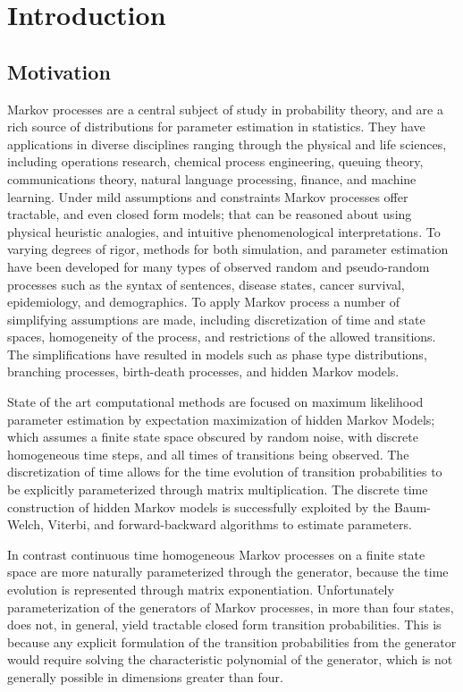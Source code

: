\chapter{Introduction}
\section{Motivation}
Markov processes are a central subject of study in probability theory, and are a rich source
of distributions for parameter estimation in statistics\cite{billingsley_probability_1995,rogers_diffusions_2000,rogers_diffusions_2000-1}.
They have applications in diverse disciplines ranging through the physical and life
sciences, including operations research, chemical process engineering, queuing theory,
communications theory, natural language processing, finance, and machine learning. Under
mild assumptions and constraints Markov processes offer tractable, and even closed form 
models; that can be reasoned about using physical heuristic analogies, and intuitive
phenomenological interpretations. To varying degrees of rigor, methods for both simulation,
and parameter estimation have been developed for many types of observed random and
pseudo-random processes such as the syntax of sentences, disease states, cancer survival,
epidemiology, and demographics. To apply Markov process a number of simplifying assumptions
are made, including discretization of time and state spaces, homogeneity of the process, and
restrictions of the allowed transitions. The simplifications have resulted in models such as
phase type distributions, branching processes, birth-death processes, and hidden Markov
models.

State of the art computational methods are focused on maximum likelihood parameter
estimation by expectation maximization of hidden Markov Models; which assumes a finite state
space obscured by random noise, with discrete homogeneous time steps, and all times of
transitions being observed. The discretization of time allows for the time evolution of
transition probabilities to be explicitly parameterized through matrix multiplication. The
discrete time construction of hidden Markov models is successfully exploited by the
Baum-Welch, Viterbi, and forward-backward algorithms to estimate parameters.

In contrast continuous time homogeneous Markov processes on a finite state space are more
naturally parameterized through the generator, because the time evolution is represented
through matrix exponentiation. Unfortunately parameterization of the generators of Markov
processes, in more than four states, does not, in general, yield tractable closed form
transition probabilities. This is because any explicit formulation of the transition
probabilities from the generator would require solving the characteristic polynomial of the
generator, which is not generally possible in dimensions greater than four. 

